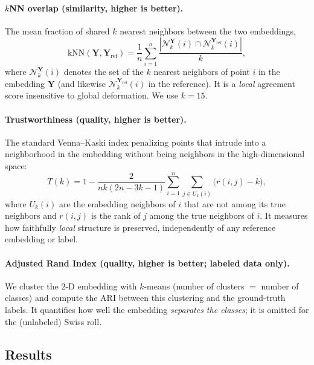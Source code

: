 \documentclass[11pt]{article}
\begin{document}
	\paragraph{$k$NN overlap (similarity, higher is better).} The mean fraction of shared
	$k$ nearest neighbors between the two embeddings,
	\begin{equation}
		\mathrm{kNN}(\mathbf{Y},\mathbf{Y}_{\mathrm{ref}})
		= \frac{1}{n}\sum_{i=1}^n \frac{|\mathcal{N}_k^{\mathbf{Y}}(i)\cap\mathcal{N}_k^{\mathbf{Y}_{\mathrm{ref}}}(i)|}{k},
	\end{equation}
	where $\mathcal{N}_k^{\mathbf{Y}}(i)$ denotes the set of the $k$ nearest neighbors of point $i$ in the embedding $\mathbf{Y}$ (and likewise $\mathcal{N}_k^{\mathbf{Y}_{\mathrm{ref}}}(i)$ in the reference). It is a \emph{local} agreement score insensitive to global deformation. We use $k=15$.
	
	\paragraph{Trustworthiness (quality, higher is better).} The standard Venna--Kaski
	index penalizing points that intrude into a neighborhood in the embedding
	without being neighbors in the high-dimensional space:
	\begin{equation}
		T(k) = 1 - \frac{2}{nk(2n-3k-1)}\sum_{i=1}^n\sum_{j\in U_k(i)}\bigl(r(i,j)-k\bigr),
	\end{equation}
	where $U_k(i)$ are the embedding neighbors of $i$ that are not among its true
	neighbors and $r(i,j)$ is the rank of $j$ among the true neighbors of $i$. It
	measures how faithfully \emph{local} structure is preserved, independently of any
	reference embedding or label.
	
	\paragraph{Adjusted Rand Index (quality, higher is better; labeled data only).} We
	cluster the $2$-D embedding with $k$-means (number of clusters $=$ number of
	classes) and compute the ARI between this clustering and the ground-truth
	labels. It quantifies how well the embedding \emph{separates the classes}; it is
	omitted for the (unlabeled) Swiss roll.
	
	\subsection{Results}
	\label{subsec:results}
	
\end{document}
